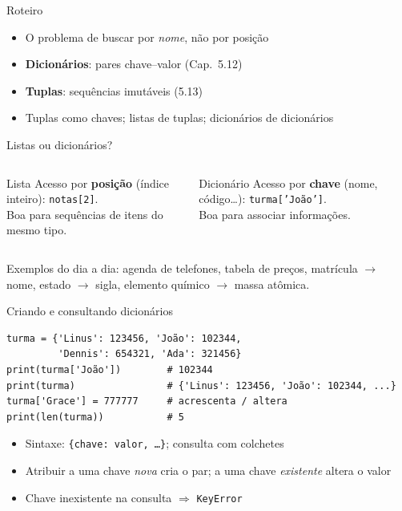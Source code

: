 \documentclass[aspectratio=169,10pt,t]{beamer}
\begin{document}
\capa

\begin{frame}{Roteiro}
  \begin{itemize}
    \item O problema de buscar por \emph{nome}, não por posição
    \item \textbf{Dicionários}: pares chave--valor (Cap.~5.12)
    \item \textbf{Tuplas}: sequências imutáveis (5.13)
    \item Tuplas como chaves; listas de tuplas; dicionários de dicionários
  \end{itemize}
\end{frame}

\begin{frame}{Listas ou dicionários?}
  \begin{columns}[T]
    \begin{block}{Lista}
      Acesso por \textbf{posição} (índice inteiro): \texttt{notas[2]}.\\
      Boa para sequências de itens do mesmo tipo.
    \end{block}
    \begin{exampleblock}{Dicionário}
      Acesso por \textbf{chave} (nome, código\ldots): \texttt{turma['João']}.\\
      Boa para associar informações.
    \end{exampleblock}
  \end{columns}
  \vspace{1.5ex}
  Exemplos do dia a dia: agenda de telefones, tabela de preços, matrícula \(\to\) nome, estado \(\to\) sigla, elemento químico \(\to\) massa atômica.
\end{frame}

\begin{frame}[fragile]{Criando e consultando dicionários}
\begin{lstlisting}
turma = {'Linus': 123456, 'João': 102344,
         'Dennis': 654321, 'Ada': 321456}
print(turma['João'])        # 102344
print(turma)                # {'Linus': 123456, 'João': 102344, ...}
turma['Grace'] = 777777     # acrescenta / altera
print(len(turma))           # 5
\end{lstlisting}
  \begin{itemize}
    \item Sintaxe: \texttt{\{chave: valor, \ldots\}}; consulta com colchetes
    \item Atribuir a uma chave \emph{nova} cria o par; a uma chave \emph{existente} altera o valor
    \item Chave inexistente na consulta \(\Rightarrow\) \texttt{KeyError}
  \end{itemize}
\end{frame}
\end{document}
